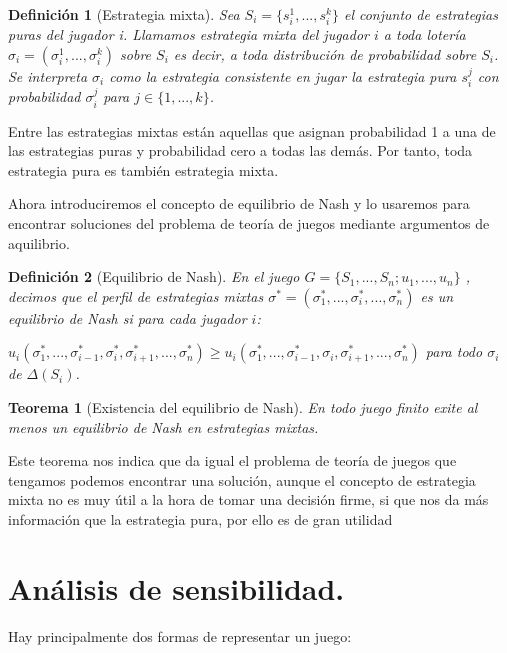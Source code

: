 \documentclass[a4paper]{report} %
\newtheorem{definicion}{Definición}[section]
\newtheorem{teorem}{Teorema}[section]
\begin{document}
\begin{definicion}[Estrategia mixta]

Sea $S_i=\lbrace s_i^1,...,s_i^k\rbrace$ el conjunto de estrategias puras del jugador i. Llamamos estrategia mixta del jugador $i$ a toda lotería $\sigma_i=(\sigma_i^1,...,\sigma_i^k)$ sobre $S_i$ es decir, a toda distribución de probabilidad sobre $S_i$. Se interpreta $\sigma_i$ como la estrategia consistente en jugar la estrategia pura $s_i^j$ con probabilidad $\sigma_i^j$ para $j \in \lbrace 1,...,k \rbrace $.
\end{definicion}

Entre las estrategias mixtas están aquellas que asignan probabilidad 1 a una de las estrategias puras y probabilidad cero a todas las demás. Por tanto, toda estrategia pura es también estrategia mixta.

Ahora introduciremos el concepto de equilibrio de Nash y lo usaremos para encontrar soluciones del problema de teoría de juegos mediante argumentos de aquilibrio.

\begin{definicion}[Equilibrio de Nash]

En el juego  $G=\lbrace S_1, ..., S_n; u_1, ..., u_n\rbrace$ , decimos que el perfil de estrategias mixtas $\sigma ^* =(\sigma _1^*,...,\sigma _i^*,...,\sigma _n^*)$ es un equilibrio de Nash si para cada jugador $i$:

$
u_i(\sigma _1^*,...,\sigma _{i-1}^*,\sigma _i^*,\sigma _{i+1}^*,...,\sigma _n^*)\geq u_i(\sigma _1^*,...,\sigma _{i-1}^*,\sigma _i,\sigma _{i+1}^*,...,\sigma _n^*) 
$ para todo $\sigma _i$ de $\Delta (S_i)$.

\end{definicion}




\begin{teorem}[Existencia del equilibrio de Nash]
En todo juego finito exite al menos un equilibrio de Nash en estrategias mixtas.
\end{teorem}

Este teorema nos indica que da igual el problema de teoría de juegos que tengamos podemos encontrar una solución, aunque el concepto de estrategia mixta no es muy útil a la hora de tomar una decisión firme, si que nos da más información que la estrategia pura, por ello es de gran utilidad 




\section{Análisis de sensibilidad.}
Hay principalmente dos formas de representar un juego:
\end{document}
